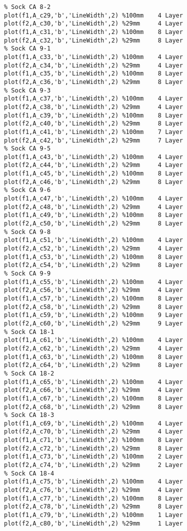 \begin{verbatim}
% Sock CA 8-2
plot(f1,A_c29,'b','LineWidth',2) %100mm    4 Layer
plot(f2,A_c30,'b','LineWidth',2) %29mm     4 Layer
plot(f1,A_c31,'b','LineWidth',2) %100mm    8 Layer
plot(f2,A_c32,'b','LineWidth',2) %29mm     8 Layer
% Sock CA 9-1
plot(f1,A_c33,'b','LineWidth',2) %100mm    4 Layer
plot(f2,A_c34,'b','LineWidth',2) %29mm     4 Layer
plot(f1,A_c35,'b','LineWidth',2) %100mm    8 Layer
plot(f2,A_c36,'b','LineWidth',2) %29mm     8 Layer
% Sock CA 9-3
plot(f1,A_c37,'b','LineWidth',2) %100mm    4 Layer
plot(f2,A_c38,'b','LineWidth',2) %29mm     4 Layer
plot(f1,A_c39,'b','LineWidth',2) %100mm    8 Layer
plot(f2,A_c40,'b','LineWidth',2) %29mm     8 Layer
plot(f1,A_c41,'b','LineWidth',2) %100mm    7 Layer
plot(f2,A_c42,'b','LineWidth',2) %29mm     7 Layer
% Sock CA 9-5
plot(f1,A_c43,'b','LineWidth',2) %100mm    4 Layer
plot(f2,A_c44,'b','LineWidth',2) %29mm     4 Layer
plot(f1,A_c45,'b','LineWidth',2) %100mm    8 Layer
plot(f2,A_c46,'b','LineWidth',2) %29mm     8 Layer
% Sock CA 9-6
plot(f1,A_c47,'b','LineWidth',2) %100mm    4 Layer
plot(f2,A_c48,'b','LineWidth',2) %29mm     4 Layer
plot(f1,A_c49,'b','LineWidth',2) %100mm    8 Layer
plot(f2,A_c50,'b','LineWidth',2) %29mm     8 Layer
% Sock CA 9-8
plot(f1,A_c51,'b','LineWidth',2) %100mm    4 Layer
plot(f2,A_c52,'b','LineWidth',2) %29mm     4 Layer
plot(f1,A_c53,'b','LineWidth',2) %100mm    8 Layer
plot(f2,A_c54,'b','LineWidth',2) %29mm     8 Layer
% Sock CA 9-9
plot(f1,A_c55,'b','LineWidth',2) %100mm    4 Layer
plot(f2,A_c56,'b','LineWidth',2) %29mm     4 Layer
plot(f1,A_c57,'b','LineWidth',2) %100mm    8 Layer
plot(f2,A_c58,'b','LineWidth',2) %29mm     8 Layer
plot(f1,A_c59,'b','LineWidth',2) %100mm    9 Layer
plot(f2,A_c60,'b','LineWidth',2) %29mm     9 Layer
% Sock CA 18-1
plot(f1,A_c61,'b','LineWidth',2) %100mm    4 Layer
plot(f2,A_c62,'b','LineWidth',2) %29mm     4 Layer
plot(f1,A_c63,'b','LineWidth',2) %100mm    8 Layer
plot(f2,A_c64,'b','LineWidth',2) %29mm     8 Layer
% Sock CA 18-2
plot(f1,A_c65,'b','LineWidth',2) %100mm    4 Layer
plot(f2,A_c66,'b','LineWidth',2) %29mm     4 Layer
plot(f1,A_c67,'b','LineWidth',2) %100mm    8 Layer
plot(f2,A_c68,'b','LineWidth',2) %29mm     8 Layer
% Sock CA 18-3
plot(f1,A_c69,'b','LineWidth',2) %100mm    4 Layer
plot(f2,A_c70,'b','LineWidth',2) %29mm     4 Layer
plot(f1,A_c71,'b','LineWidth',2) %100mm    8 Layer
plot(f2,A_c72,'b','LineWidth',2) %29mm     8 Layer
plot(f1,A_c73,'b','LineWidth',2) %100mm    2 Layer
plot(f2,A_c74,'b','LineWidth',2) %29mm     2 Layer
% Sock CA 18-4
plot(f1,A_c75,'b','LineWidth',2) %100mm    4 Layer
plot(f2,A_c76,'b','LineWidth',2) %29mm     4 Layer
plot(f1,A_c77,'b','LineWidth',2) %100mm    8 Layer
plot(f2,A_c78,'b','LineWidth',2) %29mm     8 Layer
plot(f1,A_c79,'b','LineWidth',2) %100mm    1 Layer
plot(f2,A_c80,'b','LineWidth',2) %29mm     1 Layer


\end{verbatim}
